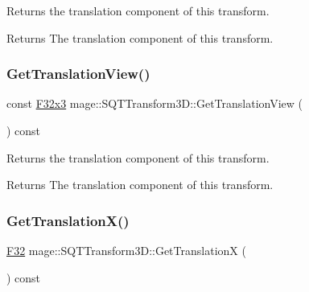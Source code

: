 Returns the translation component of this transform.

\begin{DoxyReturn}{Returns}
The translation component of this transform. 
\end{DoxyReturn}
\mbox{\label{classmage_1_1_s_q_t_transform3_d_a500661964dc094d294d162606ad0c06d}} 
\subsubsection{\texorpdfstring{Get\+Translation\+View()}{GetTranslationView()}}
{\footnotesize\ttfamily const \mbox{\hyperlink{namespacemage_a1e3c7a882af461f161caa1cbddaf1fa2}{F32x3}} mage\+::\+S\+Q\+T\+Transform3\+D\+::\+Get\+Translation\+View (\begin{DoxyParamCaption}{ }\end{DoxyParamCaption}) const\hspace{0.3cm}{\ttfamily [noexcept]}}

Returns the translation component of this transform.

\begin{DoxyReturn}{Returns}
The translation component of this transform. 
\end{DoxyReturn}
\mbox{\label{classmage_1_1_s_q_t_transform3_d_ae3d098ec4b8e92e273e4e521309ca45a}} 
\subsubsection{\texorpdfstring{Get\+Translation\+X()}{GetTranslationX()}}
{\footnotesize\ttfamily \mbox{\hyperlink{namespacemage_aa97e833b45f06d60a0a9c4fc22ae02c0}{F32}} mage\+::\+S\+Q\+T\+Transform3\+D\+::\+Get\+TranslationX (\begin{DoxyParamCaption}{ }\end{DoxyParamCaption}) const\hspace{0.3cm}{\ttfamily [noexcept]}}

